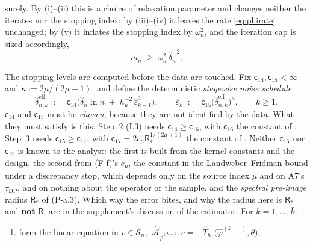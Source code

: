 \begin{definition}
surely. By (i)--(ii) this is a choice of relaxation parameter and changes neither the
iterates nor the stopping index; by (iii)--(iv) it leaves the rate \eqref{eq:phirate} unchanged; by (v)
it inflates the stopping index by $\omega_n^{2}$, and the iteration cap is sized accordingly,
\begin{equation}\label{eq:cap}
\bar m_n\;\ge\;\omega_n^{2}\,\hat\delta_n^{-2} .
\end{equation}

The stopping levels are computed before the data are touched. Fix $\mathsf c_{14},\mathsf c_{15}<\infty$
and $\kappa:=2\mu/(2\mu+1)$, and define the deterministic \emph{stagewise noise schedule}
\begin{equation}\label{eq:lfsched}
\hat\delta^{\mathrm{eff}}_{n,k}\;:=\;\mathsf c_{14}\Big(\hat\delta_n\ln n\;+\;h_u^{-2}\,\hat\varepsilon_{k-1}^{2}\Big),
\qquad
\hat\varepsilon_{k}\;:=\;\mathsf c_{15}\big(\hat\delta^{\mathrm{eff}}_{n,k}\big)^{\kappa},
\qquad k\ge1 .
\end{equation}
$\mathsf c_{14}$ and $\mathsf c_{15}$ must be
\emph{chosen}, because they are not identified by the data. What they must satisfy is this.
 Step~2
(L3) needs $\mathsf c_{14}\ge\mathsf c_{16}$, with $\mathsf c_{16}$ the constant of ;
Step~3 needs $\mathsf c_{15}\ge\mathsf c_{17}$, with $\mathsf c_{17}=2c_\mu\mathsf R_\ast^{1/(2\mu+1)}$
the constant of . Neither $\mathsf c_{16}$ nor $\mathsf c_{17}$ is known to the analyst:
the first is built from the kernel constants and the design, the second from (F-f)'s $c_\mu$, the
constant in the Landweber--Fridman bound under a discrepancy stop, which depends only on the source
index $\mu$ and on A7's $\tau_{\mathrm{DP}}$, and on nothing about the operator or the sample, 
and the \emph{spectral pre-image} radius $\mathsf R_\ast$ of (P-a.3). Which way the error bites, and why the
radius here is $\mathsf R_\ast$ and \textbf{not} $\mathsf R$, are in the supplement's discussion of the
estimator. For $k=1,\dots,\bar k$:
\begin{enumerate}
\item[(a)] form the linear equation in $v\in\mathcal S_n$,
$\ \hat{\mathcal A}_{\hat\varphi^{(k-1)}}v=-\hat T_{h_x}\big(\hat\varphi^{(k-1)},\theta\big)$;

\end{enumerate}
\end{definition}
